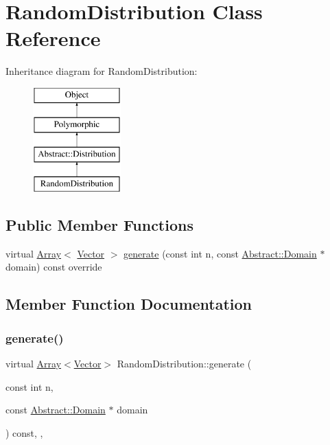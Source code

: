 \hypertarget{classRandomDistribution}{}\section{Random\+Distribution Class Reference}
\label{classRandomDistribution}
Inheritance diagram for Random\+Distribution\+:\begin{figure}[H]
\begin{center}
\leavevmode
\includegraphics[height=4.000000cm]{classRandomDistribution}
\end{center}
\end{figure}
\subsection*{Public Member Functions}
\begin{DoxyCompactItemize}
\item 
virtual \hyperlink{classArray}{Array}$<$ \hyperlink{classBasicVector}{Vector} $>$ \hyperlink{classRandomDistribution_a3e1308d2bb28c5801e6e0537a8002597}{generate} (const int n, const \hyperlink{classAbstract_1_1Domain}{Abstract\+::\+Domain} $\ast$domain) const override
\end{DoxyCompactItemize}


\subsection{Member Function Documentation}
\hypertarget{classRandomDistribution_a3e1308d2bb28c5801e6e0537a8002597}{}\label{classRandomDistribution_a3e1308d2bb28c5801e6e0537a8002597} 
\subsubsection{\texorpdfstring{generate()}{generate()}}
{\footnotesize\ttfamily virtual \hyperlink{classArray}{Array}$<$\hyperlink{classBasicVector}{Vector}$>$ Random\+Distribution\+::generate (\begin{DoxyParamCaption}\item[{const int}]{n,  }\item[{const \hyperlink{classAbstract_1_1Domain}{Abstract\+::\+Domain} $\ast$}]{domain }\end{DoxyParamCaption}) const\hspace{0.3cm}{\ttfamily [inline]}, {\ttfamily [override]}, {\ttfamily [virtual]}}

